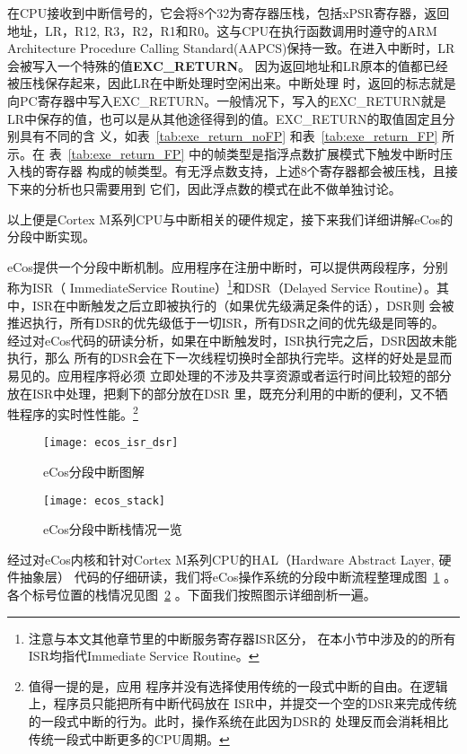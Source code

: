 在CPU接收到中断信号的，它会将8个32为寄存器压栈，包括xPSR寄存器，返回地址，LR，R12,
R3，R2，R1和R0。这与CPU在执行函数调用时遵守的ARM Architecture Procedure Calling
Standard(AAPCS)保持一致。在进入中断时，LR会被写入一个特殊的值\textbf{EXC\_RETURN}。
因为返回地址和LR原本的值都已经被压栈保存起来，因此LR在中断处理时空闲出来。中断处理
时，返回的标志就是向PC寄存器中写入EXC\_RETURN。一般情况下，写入的EXC\_RETURN就是
LR中保存的值，也可以是从其他途径得到的值。EXC\_RETURN的取值固定且分别具有不同的含
义，如表~\ref{tab:exe_return_noFP} 和表~\ref{tab:exe_return_FP} 所示。在
表~\ref{tab:exe_return_FP} 中的帧类型是指浮点数扩展模式下触发中断时压入栈的寄存器
构成的帧类型。有无浮点数支持，上述8个寄存器都会被压栈，且接下来的分析也只需要用到
它们，因此浮点数的模式在此不做单独讨论。\cite{ARM} 

以上便是Cortex M系列CPU与中断相关的硬件规定，接下来我们详细讲解eCos的分段中断实现。

eCos提供一个分段中断机制。应用程序在注册中断时，可以提供两段程序，分别称为ISR（
ImmediateService Routine）\footnote{注意与本文其他章节里的中断服务寄存器ISR区分，
在本小节中涉及的的所有ISR均指代Immediate Service Routine。}和DSR（Delayed Service 
Routine）。其中，ISR在中断触发之后立即被执行的（如果优先级满足条件的话），DSR则
会被推迟执行，所有DSR的优先级低于一切ISR，所有DSR之间的优先级是同等的。\cite{ecos_isr}
经过对eCos代码的研读分析，如果在中断触发时，ISR执行完之后，DSR因故未能执行，那么
所有的DSR会在下一次线程切换时全部执行完毕。这样的好处是显而易见的。应用程序将必须
立即处理的不涉及共享资源或者运行时间比较短的部分放在ISR中处理，把剩下的部分放在DSR
里，既充分利用的中断的便利，又不牺牲程序的实时性性能。\footnote{值得一提的是，应用
程序并没有选择使用传统的一段式中断的自由。在逻辑上，程序员只能把所有中断代码放在
ISR中，并提交一个空的DSR来完成传统的一段式中断的行为。此时，操作系统在此因为DSR的
处理反而会消耗相比传统一段式中断更多的CPU周期。}

\begin{figure}
	\centering
	\texttt{[image: ecos\_isr\_dsr]}
	\caption{eCos分段中断图解}
	\label{fig:ecos_isr_dsr}
\end{figure}

\begin{figure}
	\centering
	\texttt{[image: ecos\_stack]}
	\caption{eCos分段中断栈情况一览}
	\label{fig:ecos_stack}
\end{figure}

经过对eCos内核和针对Cortex M系列CPU的HAL（Hardware Abstract Layer, 硬件抽象层）
代码的仔细研读，我们将eCos操作系统的分段中断流程整理成图~\ref{fig:ecos_isr_dsr} 。
各个标号位置的栈情况见图~\ref{fig:ecos_stack} 。下面我们按照图示详细剖析一遍。

